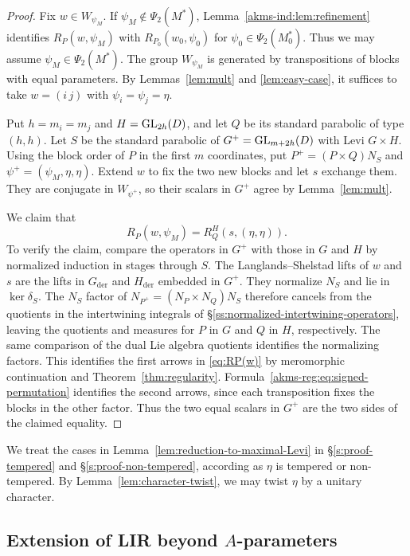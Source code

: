 \documentclass[11pt,reqno]{amsart}
\theoremstyle{plain}
\theoremstyle{definition}
\newcommand{\GL}{\tu{GL}}
\newcommand{\tu}{\textup}
\numberwithin{equation}{subsection}
\begin{document}
\begin{proof}
Fix $w\in W_{\psi_M}$. If $\psi_M\notin\Psi_2(M^*)$, Lemma~\ref{akms-ind:lem:refinement}
identifies $R_P(w,\psi_M)$ with $R_{P_0}(w_0,\psi_0)$ for
$\psi_0\in\Psi_2(M_0^*)$. Thus we may assume $\psi_M\in\Psi_2(M^*)$.
The group $W_{\psi_M}$ is generated by transpositions of blocks with
equal parameters. By Lemmas~\ref{lem:mult} and \ref{lem:easy-case}, it
suffices to take $w=(i\,j)$ with $\psi_i=\psi_j=\eta$.

Put $h=m_i=m_j$ and $H=\GL_{2h}(D)$, and let $Q$ be its standard
parabolic of type $(h,h)$. Let $S$ be the standard parabolic of
$G^+=\GL_{m+2h}(D)$ with Levi $G\times H$. Using the block order of
$P$ in the first $m$ coordinates, put $P^+=(P\times Q)N_S$ and
$\psi^+=(\psi_M,\eta,\eta)$. Extend $w$ to fix the two new blocks
and let $s$ exchange them. They are conjugate in $W_{\psi^+}$, so
their scalars in $G^+$ agree by Lemma~\ref{lem:mult}.

We claim that
\[
 R_P(w,\psi_M)=R_Q^H(s,(\eta,\eta)).
\]
To verify the claim, compare the operators in $G^+$ with those in
$G$ and $H$ by normalized induction in stages through $S$.
The Langlands--Shelstad lifts of $w$ and $s$ are the lifts in
$G_{\mathrm{der}}$ and $H_{\mathrm{der}}$ embedded in $G^+$. They
normalize $N_S$ and lie in $\ker\delta_S$. The $N_S$ factor of
$N_{P^+}=(N_P\times N_Q)N_S$ therefore cancels from the quotients
in the intertwining integrals of \S\ref{ss:normalized-intertwining-operators},
leaving the quotients and measures for $P$ in $G$ and $Q$ in $H$,
respectively. The same comparison of the dual Lie algebra quotients
identifies the normalizing factors. This identifies the first arrows in
\eqref{eq:RP(w)} by meromorphic continuation and Theorem~\ref{thm:regularity}.
Formula~\eqref{akms-reg:eq:signed-permutation} identifies the second arrows,
since each transposition fixes the blocks in the other factor.
Thus the two equal scalars in $G^+$ are the two sides of the claimed equality.
\end{proof}

We treat the cases in Lemma~\ref{lem:reduction-to-maximal-Levi}
in \S\ref{s:proof-tempered} and \S\ref{s:proof-non-tempered},
according as $\eta$ is tempered or non-tempered. By
Lemma~\ref{lem:character-twist}, we may twist $\eta$ by a unitary character.

\subsection{Extension of LIR beyond $A$-parameters}\label{ss:extension-beyond-A-parameters}
\end{document}
